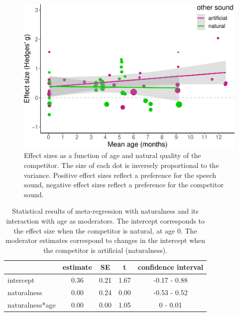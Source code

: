 \documentclass[
  man,mask,floatsintext]{apa6}
\begin{document}
\begin{figure}
\centering
\includegraphics{MA_speech_pref_files/figure-latex/natural-1.pdf}
\caption{\label{fig:natural}Effect sizes as a function of age and natural quality of the competitor. The size of each dot is inversely proportional to the variance. Positive effect sizes reflect a preference for the speech sound, negative effect sizes reflect a preference for the competitor sound.}
\end{figure}

\begin{table}[tbp]

\begin{center}
\begin{threeparttable}

\caption{\label{tab:TableNatural}Statistical results of meta-regression with naturalness and its interaction with age as moderators. The intercept corresponds to the effect size when the competitor is natural, at age 0. The moderator estimates correspond to changes in the intercept when the competitor is artificial (naturalness).}

\begin{tabular}{lcccc}
\toprule
 & estimate & SE & t & confidence interval\\
\midrule
intercept & 0.36 & 0.21 & 1.67 & -0.17 - 0.88\\
naturalness & 0.00 & 0.24 & 0.00 & -0.53 - 0.52\\
naturalness*age & 0.00 & 0.00 & 1.05 & 0 - 0.01\\
\bottomrule
\end{tabular}

\end{threeparttable}
\end{center}

\end{table}
\end{document}
